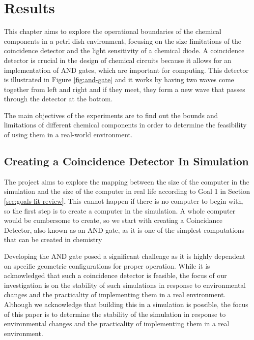 
\chapter{Results} \label{ch:results}
This chapter aims to explore the operational boundaries of the chemical components in a petri dish environment, focusing on the size limitations of the coincidence detector and the light sensitivity of a chemical diode.
A coincidence detector is crucial in the design of chemical circuits because it allows for an implementation of AND gates,
which are important for computing. This detector is illustrated in Figure \ref{fig:and-gate} and it works by having two waves come together from left and right and if they meet, they form a new wave that passes through the detector at the bottom.

The main objectives of the experiments are to find out the bounds and limitations of different chemical components in order to determine the feasibility of using them in a real-world environment.

\section{Creating a Coincidence Detector In Simulation} \label{chap:creating-detector}
The project aims to explore the mapping between the size of the computer in the simulation and the size of the computer in real life
according to Goal 1 in Section \ref{sec:goals-lit-review}. This cannot happen if there is no computer to begin with, so the first step is to create a computer in the simulation.
A whole computer would be cumbersome to create, so we start with creating a Coincidance Detector, also known as an AND gate, as it is one of the simplest computations that can be created in chemistry

Developing the AND gate posed a significant challenge as it is highly dependent on specific geometric configurations for proper operation. 
While it is acknowledged that such a coincidence detector is feasible, the focus of our investigation is on the stability of such simulations in response to environmental changes and the practicality of implementing them in a real environment.
Although we acknowledge that building this in a simulation is possible, the focus of this paper is to determine the stability of the simulation in response to environmental changes and the practicality of implementing them in a real environment. 


